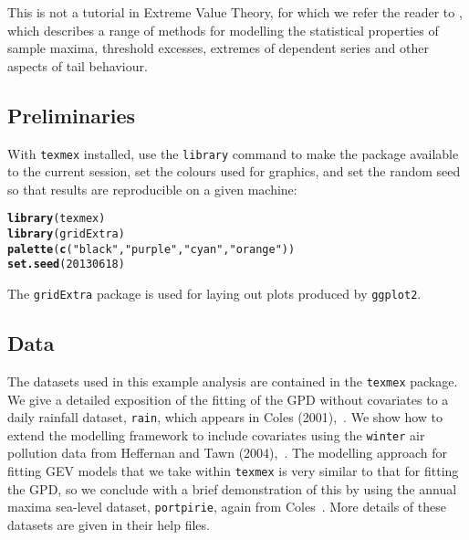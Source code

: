 \documentclass[10pt]{article}\usepackage[]{graphicx}\usepackage[]{color}
\makeatletter
\newcommand{\hlnum}[1]{\textcolor[rgb]{0.686,0.059,0.569}{#1}}%
\newcommand{\hlstr}[1]{\textcolor[rgb]{0.192,0.494,0.8}{#1}}%
\newcommand{\hlstd}[1]{\textcolor[rgb]{0.345,0.345,0.345}{#1}}%
\newcommand{\hlkwd}[1]{\textcolor[rgb]{0.737,0.353,0.396}{\textbf{#1}}}%
\newenvironment{kframe}{%
 \def\at@end@of@kframe{}%
 \ifinner\ifhmode%
  \def\at@end@of@kframe{\end{minipage}}%
  \begin{minipage}{\columnwidth}%
 \fi\fi%
 \def\FrameCommand##1{\hskip\@totalleftmargin \hskip-\fboxsep
 \colorbox{shadecolor}{##1}\hskip-\fboxsep
     \hskip-\linewidth \hskip-\@totalleftmargin \hskip\columnwidth}%
 \MakeFramed {\advance\hsize-\width
   \@totalleftmargin\z@ \linewidth\hsize
   \@setminipage}}%
 {\par\unskip\endMakeFramed%
 \at@end@of@kframe}
\newenvironment{knitrout}{}{} %
\makeatother
\begin{document}
This is not a tutorial in Extreme Value Theory, for which we refer the reader to \cite{coles}, which describes a range of methods for modelling the statistical properties of sample maxima, threshold excesses, extremes of dependent series and other aspects of tail behaviour.

%
\subsection{Preliminaries}
%
With {\tt texmex} installed, use the {\tt library} command to make the package available to the current session, set the colours used for graphics, and set the random seed so that results are reproducible on a given machine:
\begin{knitrout}
\color{fgcolor}\begin{kframe}
\begin{alltt}
\hlkwd{library}\hlstd{(texmex)}
\hlkwd{library}\hlstd{(gridExtra)}
\hlkwd{palette}\hlstd{(}\hlkwd{c}\hlstd{(}\hlstr{"black"}\hlstd{,}\hlstr{"purple"}\hlstd{,}\hlstr{"cyan"}\hlstd{,}\hlstr{"orange"}\hlstd{))}
\hlkwd{set.seed}\hlstd{(}\hlnum{20130618}\hlstd{)}
\end{alltt}
\end{kframe}
\end{knitrout}
The {\tt gridExtra} package is used for laying out plots produced by {\tt ggplot2}.
%
\subsection{Data}
%
The datasets used in this example analysis are contained in the {\tt texmex}
package. We give a detailed exposition of the fitting of the GPD without covariates to a daily rainfall dataset, {\tt rain}, which appears in Coles (2001),~\cite{coles}.  We show how to extend the modelling framework to include covariates using the {\tt winter} air pollution data from Heffernan and Tawn (2004),~\cite{heffernanTawn}.  The modelling approach for fitting GEV models that we take within {\tt texmex} is very similar to that for fitting the GPD, so we conclude with a brief demonstration of this by using the annual maxima sea-level dataset, {\tt portpirie}, again from Coles~\cite{coles}.  More details of these datasets are given in their help files.
\end{document}
